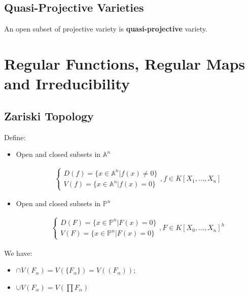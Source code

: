 \documentclass[Total.tex]{subfiles}
\begin{document}
			
			
			\subsection{Quasi-Projective Varieties}
			
			\begin{Def}
				An open subset of projective variety is \textbf{quasi-projective} variety.
			\end{Def}
		
		\section{Regular Functions, Regular Maps and Irreducibility}
		
			\subsection{Zariski Topology}
			
			\begin{Def}
				Define: 
				
				\begin{itemize}
					\item Open and closed subsets in $\mathbb{A}^n$
					
					\begin{gather*}
						\begin{cases}
							D(f)=\{x\in \mathbb{A}^n|f(x)\not=0\}\\
							V(f)=\{x\in \mathbb{A}^n|f(x)=0\}
						\end{cases},f\in K[X_1,\dots,X_n]
					\end{gather*}
					\item Open and closed subsets in $\mathbb{P}^n$
					
					\begin{gather*}
						\begin{cases}
							D(F)=\{x\in \mathbb{P}^n|F(x)=0\}\\
							V(F)=\{x\in \mathbb{P}^n|F(x)=0\}
						\end{cases},F\in K[X_0,\dots,X_n]^h
					\end{gather*}
				\end{itemize}
			\end{Def}
			
			\begin{lemma}
				We have:
				
				\begin{itemize}
					\item $\cap V(F_\alpha)=V(\{F_\alpha\})=V((F_\alpha))$;
					\item $\cup V(F_\alpha)=V(\prod F_\alpha)$
				\end{itemize}
			\end{lemma}
			
\end{document}
